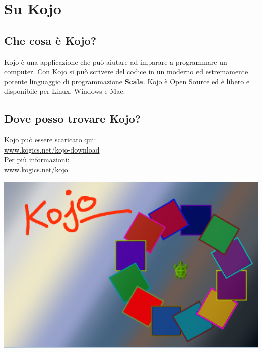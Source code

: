 \chapter{Su Kojo}
\begin{multicols}{2}
\section*{\color{black}Che cosa è Kojo?}
Kojo è una applicazione che può aiutare ad imparare a programmare un computer. Con Kojo si può scrivere del codice in un moderno ed estremamente potente linguaggio di programmazione {\bf\color{blue}Scala}. Kojo è Open Source ed è libero e disponibile per Linux, Windows e Mac.
\section*{\color{black}Dove posso trovare Kojo?}
Kojo può essere scaricato qui: 
\\

\href{http://www.kogics.net/kojo-download}{www.kogics.net/kojo-download}
\\

Per più informazioni: 
\\

\href{http://www.kogics.net/kojo}{www.kogics.net/kojo}

\columnbreak

\begin{center}
\includegraphics[width=14.0cm]{../img/kojo.png}
\end{center}

\end{multicols}

